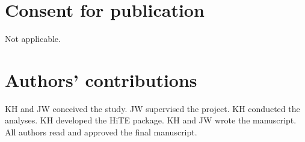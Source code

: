 \documentclass{bmcart}
\begin{document}
\begin{backmatter}
\section*{Consent for publication}%
Not applicable.

\section*{Authors' contributions}
KH and JW conceived the study. JW supervised the project. KH conducted the analyses. KH developed the HiTE package. KH and JW wrote the manuscript. All authors read and approved the final manuscript.







\end{backmatter}
\end{document}

